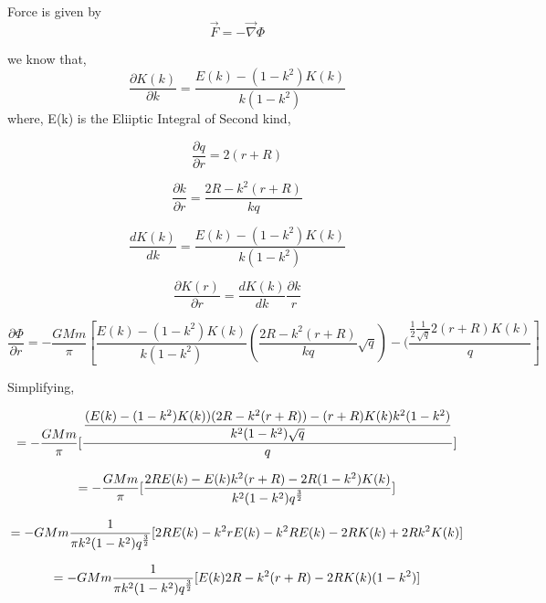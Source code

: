 Force is given by
\begin{equation}
   \vec{F} = - \vec{\nabla} \Phi 
\end{equation}

we know that,
\begin{equation}
   \frac{\partial K (k)}{\partial k } = \frac{E(k)- (1-k^2) K(k)}{k(1- k^2)} 
\end{equation}
where, E(k) is the Eliiptic Integral of Second kind,

\begin{equation}
 \frac{\partial q}{\partial r} = 2 (r + R)
\end{equation}

\begin{equation}
 \frac{\partial k}{\partial r} = \frac{2R - k^2 (r + R)}{kq} 
\end{equation}

\begin{equation}
\frac{d K(k)}{d k} = \frac{E(k) - (1-k^2) K(k)}{k (1-k^2)} 
\end{equation}

\begin{equation}
\frac{\partial K (r)}{\partial r} = \frac{d K(k)}{dk} \frac{\partial k }{r} 
\end{equation}

\begin{equation}
\frac{\partial \Phi}{\partial r} = - \frac{GMm }{\pi} [ \frac{E(k) - (1-k^2) K(k)}{k (1-k^2)} (\frac{2R - k^2 (r + R)}{kq} \sqrt{q}) - (\frac{\frac{1}{2} \frac{1}{\sqrt{q}}2 (r + R ) K(k)} {q}] 
\end{equation}

Simplifying,

\begin{equation}
   \begin{gathered}
      = - \frac{GMm }{\pi} [\dfrac{\dfrac{(E(k)- (1 - k^2 )K(k))(2 R - k^2 (r + R)) - (r + R) K(k) k^2 (1 - k^2)}{k^2 (1-k^2)\sqrt{q}}}{q}]\\[0.5\baselineskip]
      = - \frac{GMm }{\pi} [\frac{2 R E(k) - E (k) k^2 (r+R) - 2 R(1-k^2) K(k)}{k^2 (1 - k^2) q^\frac{3}{2}}]\\[0.5\baselineskip]
      = - GMm \frac{1}{\pi k^2 (1 - k ^2)  q^\frac{3}{2}} [2 R E (k) - k^2 r E(k)- k^2 R E(k) - 2 R K(k) + 2 R k^2 K(k)]\\[0.5\baselineskip]
      = - GMm \frac{1}{\pi k^2 (1 - k ^2)  q^\frac{3}{2}} [E (k) 2R - k^2 (r + R) - 2 R K(k) (1 - k^2) ] 
   \end{gathered}
\end{equation}
 
